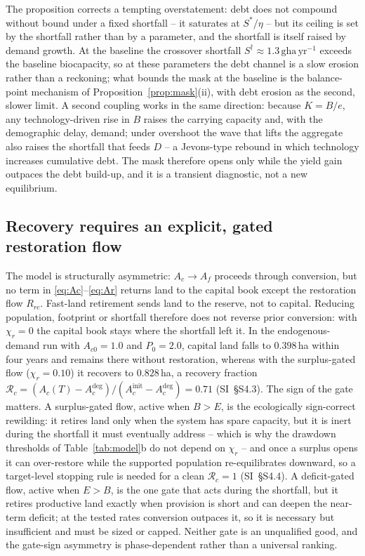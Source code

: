 \documentclass[preprint,12pt,authoryear]{elsarticle}
\begin{document}
The proposition corrects a tempting overstatement: debt does not compound without bound under a fixed shortfall -- it saturates at $S^*/\eta$ -- but its ceiling is set by the shortfall rather than by a parameter, and the shortfall is itself raised by demand growth. At the baseline the crossover shortfall $S^\dagger\approx1.3\,\mathrm{gha\,yr^{-1}}$ exceeds the baseline biocapacity, so at these parameters the debt channel is a slow erosion rather than a reckoning; what bounds the mask at the baseline is the balance-point mechanism of Proposition~\ref{prop:mask}(ii), with debt erosion as the second, slower limit. A second coupling works in the same direction: because $K=B/e$, any technology-driven rise in $B$ raises the carrying capacity and, with the demographic delay, demand; under overshoot the wave that lifts the aggregate also raises the shortfall that feeds $D$ -- a Jevons-type rebound in which technology increases cumulative debt. The mask therefore opens only while the yield gain outpaces the debt build-up, and it is a transient diagnostic, not a new equilibrium.

\subsection{Recovery requires an explicit, gated restoration flow}\label{sec:recovery}

The model is structurally asymmetric: $A_c\to A_f$ proceeds through conversion, but no term in \eqref{eq:Ac}--\eqref{eq:Ar} returns land to the capital book except the restoration flow $R_{rc}$. Fast-land retirement sends land to the reserve, not to capital. Reducing population, footprint or shortfall therefore does not reverse prior conversion: with $\chi_r=0$ the capital book stays where the shortfall left it. In the endogenous-demand run with $A_{c0}=1.0$ and $P_0=2.0$, capital land falls to $0.398$\,ha within four years and remains there without restoration, whereas with the surplus-gated flow ($\chi_r=0.10$) it recovers to $0.828$\,ha, a recovery fraction $\mathcal R_c=(A_c(T)-A_c^{\mathrm{deg}})/(A_c^{\mathrm{init}}-A_c^{\mathrm{deg}})=0.71$ (SI~\S S4.3). The sign of the gate matters. A surplus-gated flow, active when $B>E$, is the ecologically sign-correct rewilding: it retires land only when the system has spare capacity, but it is inert during the shortfall it must eventually address -- which is why the drawdown thresholds of Table~\ref{tab:model}b do not depend on $\chi_r$ -- and once a surplus opens it can over-restore while the supported population re-equilibrates downward, so a target-level stopping rule is needed for a clean $\mathcal R_c=1$ (SI~\S S4.4). A deficit-gated flow, active when $E>B$, is the one gate that acts during the shortfall, but it retires productive land exactly when provision is short and can deepen the near-term deficit; at the tested rates conversion outpaces it, so it is necessary but insufficient and must be sized or capped. Neither gate is an unqualified good, and the gate-sign asymmetry is phase-dependent rather than a universal ranking.
\end{document}
